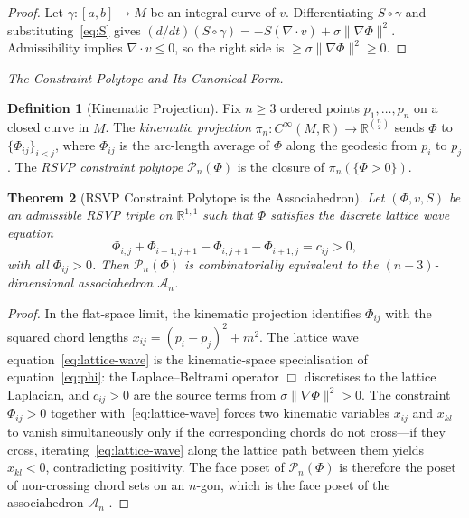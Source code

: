 \documentclass[11pt]{article}
\theoremstyle{plain}
\newtheorem{theorem}{Theorem}[section]
\theoremstyle{definition}
\newtheorem{definition}[theorem]{Definition}
\theoremstyle{remark}
\newcommand{\R}{\mathbb{R}}
\newcommand{\Phif}{\Phi}
\newcommand{\vf}{v}
\newcommand{\Sf}{S}
\newcommand{\Assoc}{\mathcal{A}_n}
\begin{document}
\begin{proof}
Let $\gamma: [a,b] \to M$ be an integral curve of $\vf$. Differentiating $\Sf \circ \gamma$ and substituting~\eqref{eq:S} gives $(d/dt)(\Sf \circ \gamma) = -\Sf(\nabla \cdot \vf) + \sigma\|\nabla\Phif\|^2$. Admissibility implies $\nabla \cdot \vf \leq 0$, so the right side is $\geq \sigma\|\nabla\Phif\|^2 \geq 0$.
\end{proof}

\medskip\noindent\textit{The Constraint Polytope and Its Canonical Form.}

\begin{definition}[Kinematic Projection]
Fix $n \geq 3$ ordered points $p_1, \ldots, p_n$ on a closed curve in $M$. The \emph{kinematic projection} $\pi_n: C^\infty(M,\R) \to \R^{\binom{n}{2}}$ sends $\Phif$ to $\{\Phif_{ij}\}_{i < j}$, where $\Phif_{ij}$ is the arc-length average of $\Phif$ along the geodesic from $p_i$ to $p_j$. The \emph{RSVP constraint polytope} $\mathcal{P}_n(\Phif)$ is the closure of $\pi_n(\{\Phif > 0\})$.
\end{definition}

\begin{theorem}[RSVP Constraint Polytope is the Associahedron]
\label{thm:assoc}
Let $(\Phif, \vf, \Sf)$ be an admissible RSVP triple on $\R^{1,1}$ such that $\Phif$ satisfies the discrete lattice wave equation
\begin{equation}
\label{eq:lattice-wave}
  \Phif_{i,j} + \Phif_{i+1,j+1} - \Phif_{i,j+1} - \Phif_{i+1,j} = c_{ij} > 0,
\end{equation}
with all $\Phif_{ij} > 0$. Then $\mathcal{P}_n(\Phif)$ is combinatorially equivalent to the $(n-3)$-dimensional associahedron $\Assoc$.
\end{theorem}

\begin{proof}
In the flat-space limit, the kinematic projection identifies $\Phif_{ij}$ with the squared chord lengths $x_{ij} = (p_i - p_j)^2 + m^2$. The lattice wave equation~\eqref{eq:lattice-wave} is the kinematic-space specialisation of equation~\eqref{eq:phi}: the Laplace--Beltrami operator $\Box$ discretises to the lattice Laplacian, and $c_{ij} > 0$ are the source terms from $\sigma\|\nabla\Phif\|^2 > 0$. The constraint $\Phif_{ij} > 0$ together with~\eqref{eq:lattice-wave} forces two kinematic variables $x_{ij}$ and $x_{kl}$ to vanish simultaneously only if the corresponding chords do not cross---if they cross, iterating~\eqref{eq:lattice-wave} along the lattice path between them yields $x_{kl} < 0$, contradicting positivity. The face poset of $\mathcal{P}_n(\Phif)$ is therefore the poset of non-crossing chord sets on an $n$-gon, which is the face poset of the associahedron $\Assoc$ \cite{Stasheff1963, Loday2004}.
\end{proof}
\end{document}
